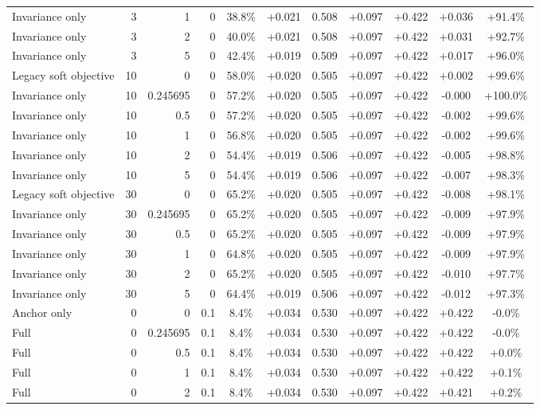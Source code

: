 \begin{table}[htbp]
\begin{tabular}{lrrrccccccc}
Invariance only & 3 & 1 & 0 & 38.8\% & +0.021 & 0.508 & +0.097 & +0.422 & +0.036 & +91.4\% \\
Invariance only & 3 & 2 & 0 & 40.0\% & +0.021 & 0.508 & +0.097 & +0.422 & +0.031 & +92.7\% \\
Invariance only & 3 & 5 & 0 & 42.4\% & +0.019 & 0.509 & +0.097 & +0.422 & +0.017 & +96.0\% \\
Legacy soft objective & 10 & 0 & 0 & 58.0\% & +0.020 & 0.505 & +0.097 & +0.422 & +0.002 & +99.6\% \\
Invariance only & 10 & 0.245695 & 0 & 57.2\% & +0.020 & 0.505 & +0.097 & +0.422 & -0.000 & +100.0\% \\
Invariance only & 10 & 0.5 & 0 & 57.2\% & +0.020 & 0.505 & +0.097 & +0.422 & -0.002 & +99.6\% \\
Invariance only & 10 & 1 & 0 & 56.8\% & +0.020 & 0.505 & +0.097 & +0.422 & -0.002 & +99.6\% \\
Invariance only & 10 & 2 & 0 & 54.4\% & +0.019 & 0.506 & +0.097 & +0.422 & -0.005 & +98.8\% \\
Invariance only & 10 & 5 & 0 & 54.4\% & +0.019 & 0.506 & +0.097 & +0.422 & -0.007 & +98.3\% \\
Legacy soft objective & 30 & 0 & 0 & 65.2\% & +0.020 & 0.505 & +0.097 & +0.422 & -0.008 & +98.1\% \\
Invariance only & 30 & 0.245695 & 0 & 65.2\% & +0.020 & 0.505 & +0.097 & +0.422 & -0.009 & +97.9\% \\
Invariance only & 30 & 0.5 & 0 & 65.2\% & +0.020 & 0.505 & +0.097 & +0.422 & -0.009 & +97.9\% \\
Invariance only & 30 & 1 & 0 & 64.8\% & +0.020 & 0.505 & +0.097 & +0.422 & -0.009 & +97.9\% \\
Invariance only & 30 & 2 & 0 & 65.2\% & +0.020 & 0.505 & +0.097 & +0.422 & -0.010 & +97.7\% \\
Invariance only & 30 & 5 & 0 & 64.4\% & +0.019 & 0.506 & +0.097 & +0.422 & -0.012 & +97.3\% \\
Anchor only & 0 & 0 & 0.1 & 8.4\% & +0.034 & 0.530 & +0.097 & +0.422 & +0.422 & -0.0\% \\
Full & 0 & 0.245695 & 0.1 & 8.4\% & +0.034 & 0.530 & +0.097 & +0.422 & +0.422 & -0.0\% \\
Full & 0 & 0.5 & 0.1 & 8.4\% & +0.034 & 0.530 & +0.097 & +0.422 & +0.422 & +0.0\% \\
Full & 0 & 1 & 0.1 & 8.4\% & +0.034 & 0.530 & +0.097 & +0.422 & +0.422 & +0.1\% \\
Full & 0 & 2 & 0.1 & 8.4\% & +0.034 & 0.530 & +0.097 & +0.422 & +0.421 & +0.2\% \\

\end{tabular}
\end{table}
